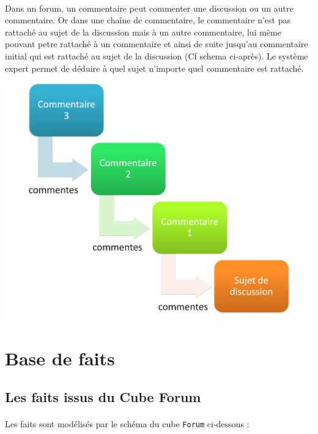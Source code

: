 \documentclass {report}
\begin{document}
\paragraph{}
Dans un forum, un commentaire peut commenter une discussion ou un autre commentaire. Or dans une chaîne de commentaire, le commentaire n'est pas rattaché au sujet de la discussion mais à un autre commentaire, lui même pouvant petre rattaché à un commentaire et ainsi de suite jusqu'au commentaire initial qui est rattaché au sujet de la discussion (Cf schema ci-après). Le système expert permet de déduire à quel sujet n'importe quel commentaire est rattaché.

\begin{center}
\includegraphics[scale=0.1]{chain.png}
\end{center}

\section{Base de faits}

\subsection{Les faits issus du Cube Forum}
\paragraph{}
Les faits sont modélisés par le schéma du cube \verb+Forum+ ci-dessous : 
\end{document}
